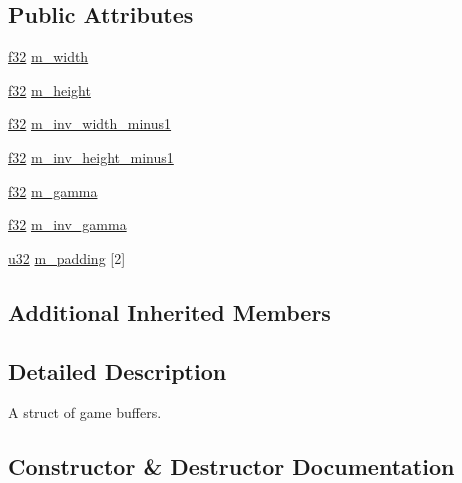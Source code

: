 \subsection*{Public Attributes}
\begin{DoxyCompactItemize}
\item 
\hyperlink{namespacemage_a6a44ad388483959dc4dff9f2aef91431}{f32} \hyperlink{structmage_1_1_game_buffer_ad70c0d08a8d1bf051bfef319acb811c9}{m\+\_\+width}
\item 
\hyperlink{namespacemage_a6a44ad388483959dc4dff9f2aef91431}{f32} \hyperlink{structmage_1_1_game_buffer_a3bbb3cedcf9c75ca69d2424275264129}{m\+\_\+height}
\item 
\hyperlink{namespacemage_a6a44ad388483959dc4dff9f2aef91431}{f32} \hyperlink{structmage_1_1_game_buffer_a5f6f9c999f4bebc5acf88f450dbee698}{m\+\_\+inv\+\_\+width\+\_\+minus1}
\item 
\hyperlink{namespacemage_a6a44ad388483959dc4dff9f2aef91431}{f32} \hyperlink{structmage_1_1_game_buffer_a1b3ac2e9c244354b90f31926de4e5774}{m\+\_\+inv\+\_\+height\+\_\+minus1}
\item 
\hyperlink{namespacemage_a6a44ad388483959dc4dff9f2aef91431}{f32} \hyperlink{structmage_1_1_game_buffer_aa0c2404e00aa5ab13965e5ca5ba92451}{m\+\_\+gamma}
\item 
\hyperlink{namespacemage_a6a44ad388483959dc4dff9f2aef91431}{f32} \hyperlink{structmage_1_1_game_buffer_ade898ebb4f6ee2766e67162494df249c}{m\+\_\+inv\+\_\+gamma}
\item 
\hyperlink{namespacemage_af2b398bf98eb10351f49cad73fe2cc73}{u32} \hyperlink{structmage_1_1_game_buffer_aace840410122d565d302c78bd82de45e}{m\+\_\+padding} \mbox{[}2\mbox{]}
\end{DoxyCompactItemize}
\subsection*{Additional Inherited Members}


\subsection{Detailed Description}
A struct of game buffers. 

\subsection{Constructor \& Destructor Documentation}
\hypertarget{structmage_1_1_game_buffer_ade6ea6f9d04f829d990b848f9e210349}{}\label{structmage_1_1_game_buffer_ade6ea6f9d04f829d990b848f9e210349} 
